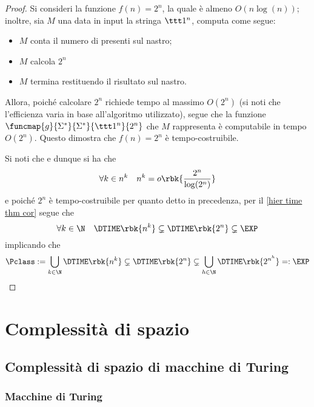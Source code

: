 \documentclass[a4paper, 12pt]{report}
\begin{document}
    \begin{proof}
        Si consideri la funzione $f(n) = 2^n$, la quale è almeno $O(n \log(n))$; inoltre, sia $M$ una \TM data in input la stringa $\ttt 1^n$, computa come segue:

        \begin{itemize}
            \item $M$ conta il numero di  presenti sul nastro;
            \item $M$ calcola $2^n$
            \item $M$ termina restituendo il risultato sul nastro.
        \end{itemize}

        Allora, poiché calcolare $2^n$ richiede tempo al massimo $O(2^n)$ (si noti che l'efficienza varia in base all'algoritmo utilizzato), segue che la funzione $\funcmap{g}{\Sigma^*}{\Sigma^*}{\ttt 1^n}{2^n}$ che $M$ rappresenta è computabile in tempo $O(2^n)$. Questo dimostra che $f(n) = 2^n$ è tempo-costruibile.

        Si noti che  e dunque si ha che $$\forall k \in n^k \quad n^k = o \rbk{\dfrac{2^n}{\log(2^n)}}$$ e poiché $2^n$ è tempo-costruibile per quanto detto in precedenza, per il \cref{hier time thm cor} segue che $$\forall k \in \N \quad \DTIME \rbk{n^k} \subsetneq \DTIME \rbk{2^n} \subsetneq \EXP$$ implicando che $$\Pclass := \bigcup_{k \in \N} {\DTIME \rbk{n^k}} \subsetneq \DTIME \rbk{2^n} \subsetneq \bigcup_{h \in \N} {\DTIME \rbk{2^{n^h}}} =: \EXP$$
    \end{proof}

    \chapter{Complessità di spazio}

    \section{Complessità di spazio di macchine di Turing}

    \subsection{Macchine di Turing}
\end{document}
